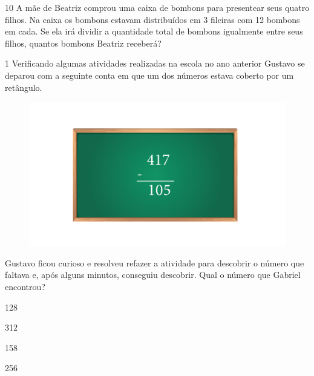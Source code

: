 
\num{10} A mãe de Beatriz comprou uma caixa de bombons para presentear seus
quatro filhos. Na caixa os bombons estavam distribuídos em 3 fileiras
com 12 bombons em cada. Se ela irá dividir a quantidade total de bombons
igualmente entre seus filhos, quantos bombons Beatriz receberá?




\num{1} Verificando algumas atividades realizadas na escola no ano anterior
Gustavo se deparou com a seguinte conta em que um dos números estava
coberto por um retângulo.

\begin{figure}[htpb!]
\includegraphics[width=\textwidth]{../ilustracoes/MAT5/SAEB_5ANO_MAT_figura22.png}
\end{figure}

Gustavo ficou curioso e resolveu refazer a atividade para descobrir o
número que faltava e, após alguns minutos, conseguiu descobrir. Qual o número que Gabriel encontrou?

\begin{escolha}
\item
  128
\item
  312
\item
  158
\item
  256
\end{escolha}


